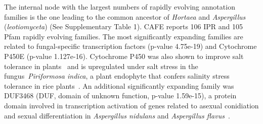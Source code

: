 \documentclass[jof,article,submit,moreauthors,pdftex,10pt,a4paper]{Definitions/mdpi}
\newcommand{\aspNid}{\textit{Aspergillus nidulans}}
\begin{document}
The internal node with the largest numbers of rapidly evolving annotation families is the one leading to the common ancestor of \textit{Hortaea} and \textit{Aspergillus} (\textit{leotiomyceta}) (See Supplementary Table 1). CAFE reports 106 IPR and 105 Pfam rapidly evolving families. The most significantly expanding families are related to fungal-specific transcription factors (p-value 4.75e-19) and Cytochrome P450E (p-value 1.127e-16). Cytochrome P450 was also shown to improve salt tolerance in plants~\cite{Yan2016} and is upregulated under salt stress in the fungus~\textit{Piriformosa indica}, a plant endophyte that confers salinity stress tolerance in rice plants~\cite{Gahlot2015}. 
An additional significantly expanding family was DUF3468 (DUF, domain of unknown function, p-value 1.59e-15), a protein domain involved in transcription activation of genes related to asexual conidiation and sexual differentiation in \aspNid{} and \textit{Aspergillus flavus}~\cite{Chang2013}.

\end{document}
